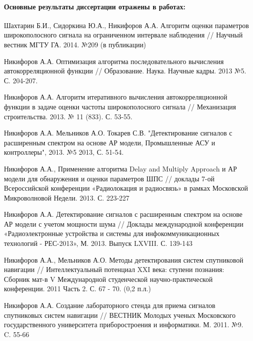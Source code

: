 \paragraph{Основные результаты диссертации отражены в работах:}
\begin{enumerate}
	{\bf{
	\item Шахтарин Б.И., Сидоркина Ю.А., Никифоров А.А. Алгоритм оценки параметров широкополосного сигнала на ограниченном интервале наблюдения //
		Научный вестник МГТУ ГА. 2014. №209 (в публикации)
	\item Никифоров А.А. Оптимизация алгоритма последовательного вычисления автокорреляционной функции //
		Образование. Наука. Научные кадры. 2013 №5. С. 204-207.
	\item Никифоров А.А. Алгоритм итеративного вычисления автокорреляционной функции в задаче оценки частоты широкополосного сигнала //
		Механизация строительства. 2013. № 11 (833). С. 53-55.
	\item Никифоров А.А. Мельников А.О. Токарев С.В. "Детектирование сигналов с расширенным спектром на основе АР модели,
		Промышленные АСУ и контроллеры", 2013. №5 2013, С. 51-54.
	}}

	\item Никифоров А.А., Применение алгоритма Delay and Multiply Approach и АР модели для обнаружения и оценки параметров ШПС //
		доклады 7-ой Всероссийской конференции «Радиолокация и радиосвязь» в рамках Московской Микроволновой Недели. 2013. С. 223-227 
	\item Никифоров А.А. Детектирование сигналов с расширенным спектром на основе АР модели с учетом мощности шума // Доклады международной конференции
		«Радиоэлектронные устройства и системы для инфокоммуникационных технологий - РЕС-2013», М. 2013. Выпуск LXVIII. С. 139-143
	\item Никифоров А.А., Мельников А.О. Методы детектирования систем спутниковой навигации // Интеллектуальный потенциал XXI века:
		ступени познания: Сборник мат-в V Международной студенческой научно-практической конференции. 2011 Часть 2. С. 67 - 70. (0,2 п.л.)

	\item Никифоров А.А. Создание лабораторного стенда для приема сигналов спутниковых систем навигации // ВЕСТНИК Молодых ученых Московского
		государственного университета приборостроения и информатики. М. 2011. №9. C. 55-66
\end{enumerate}
